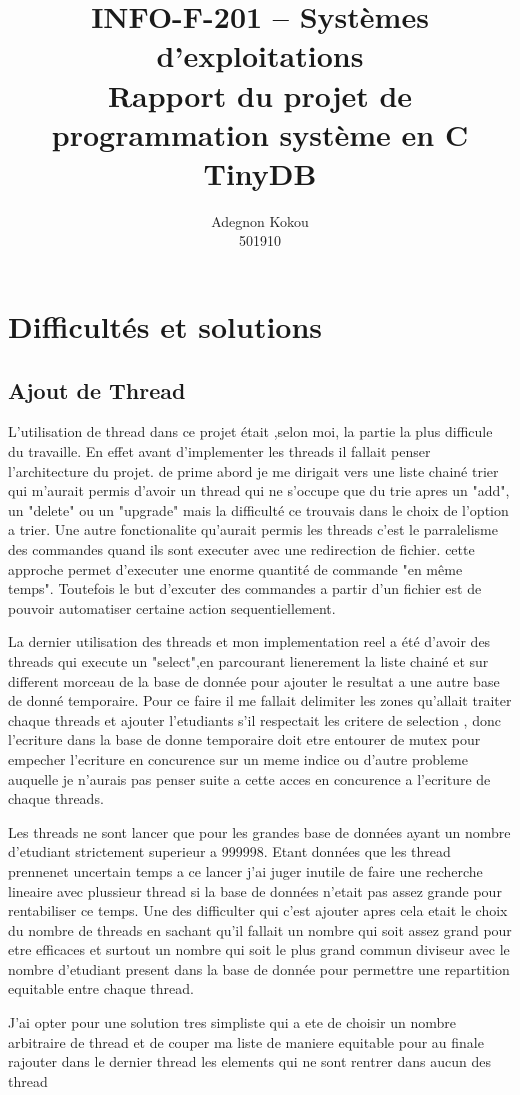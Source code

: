 \documentclass[a4paper, 12pt]{article}
\begin{document}
\tableofcontents

\title{INFO-F-201 – Systèmes d’exploitations\\
Rapport du projet de programmation système en C
TinyDB}
\author{Adegnon Kokou\\501910}
\maketitle{}

\section{Difficultés et solutions}

\subsection{Ajout de Thread}
L'utilisation de thread dans ce projet était ,selon moi, la partie la plus difficule
du travaille. En effet avant d'implementer les threads il fallait penser 
l'architecture du projet. de prime abord je me dirigait vers une liste chainé trier qui m'aurait permis d'avoir un thread qui
ne s'occupe que du trie apres un "add", un "delete" ou un "upgrade" mais la difficulté ce trouvais dans le choix de l'option a trier.
Une autre fonctionalite qu'aurait permis les threads c'est le parralelisme des commandes quand ils sont executer avec une redirection de fichier.
cette approche permet d'executer une enorme quantité de commande "en même temps". Toutefois le but d'excuter des commandes a partir d'un fichier est de pouvoir
automatiser certaine action sequentiellement.

La dernier utilisation des threads et mon implementation reel a été d'avoir des threads qui execute un "select",en parcourant lienerement la liste chainé et sur different morceau de la base de donnée pour ajouter le resultat a une autre base de donné temporaire. Pour ce faire il me fallait delimiter les zones qu'allait traiter 
chaque threads et ajouter l'etudiants s'il respectait les critere de selection , donc l'ecriture dans la base de donne temporaire doit etre entourer
de mutex pour empecher l'ecriture en concurence sur un meme indice ou d'autre probleme auquelle je n'aurais 
pas penser suite a cette acces en concurence a l'ecriture de chaque threads.

Les threads ne sont lancer que pour les grandes base de données ayant un nombre d'etudiant strictement superieur a 999998. Etant données que les thread prennenet uncertain temps a ce lancer j'ai juger inutile de faire une recherche lineaire avec plussieur thread si la base de données n'etait pas assez grande pour rentabiliser ce temps. Une des difficulter qui c'est ajouter apres cela etait le choix
du nombre de threads en sachant qu'il fallait un nombre qui soit assez grand pour etre efficaces et surtout un nombre qui soit le plus grand commun diviseur avec le nombre 
d'etudiant present dans la base de donnée  pour permettre une repartition equitable entre chaque thread. 

J'ai opter pour une solution tres simpliste qui a ete de choisir un nombre arbitraire de thread et de couper ma liste de maniere equitable pour au finale rajouter dans le dernier thread les elements qui ne sont rentrer dans aucun  des thread  
\end{document}

